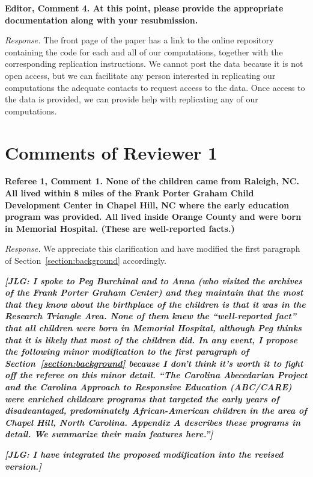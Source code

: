 \noindent \textbf{Editor, Comment 4. At this point, please provide the appropriate documentation along with your resubmission.}

\noindent \textit{Response.} The front page of the paper has a link to the online repository containing the code for each and all of our computations, together with the corresponding replication instructions. We cannot post the data because it is not open access, but we can facilitate any person interested in replicating our computations the adequate contacts to request access to the data. Once access to the data is provided, we can provide help with replicating any of our computations.

\section*{Comments of Reviewer 1}

\noindent \textbf{Referee 1, Comment 1. None of the children came from Raleigh, NC. All lived within 8 miles of the Frank Porter Graham Child Development Center in Chapel Hill, NC where the early education program was provided. All lived inside Orange County and were born in Memorial Hospital. (These are well-reported facts.)}

\noindent \textit{Response.} We appreciate this clarification and have modified the first paragraph of Section~\ref{section:background} accordingly.

\textit{\textbf{[JLG: I spoke to Peg Burchinal and to Anna (who visited the archives of the Frank Porter Graham Center) and they maintain that the most that they know about the birthplace of the children is that it was in the Research Triangle Area. None of them knew the ``well-reported fact'' that all children were born in Memorial Hospital, although Peg thinks that it is likely that most of the children did. In any event, I propose the following minor modification to the first paragraph of Section~\ref{section:background} because I don't think it's worth it to fight off the referee on this minor detail. ``The Carolina Abecedarian Project and the Carolina Approach to Responsive Education (ABC/CARE) were enriched childcare programs that targeted the early years of disadvantaged, predominately African-American children in the area of Chapel Hill, North Carolina. Appendix A describes these programs in detail. We summarize their main features here.'']}}

\textit{\textbf{[JLG: I have integrated the proposed modification into the revised version.]}}

